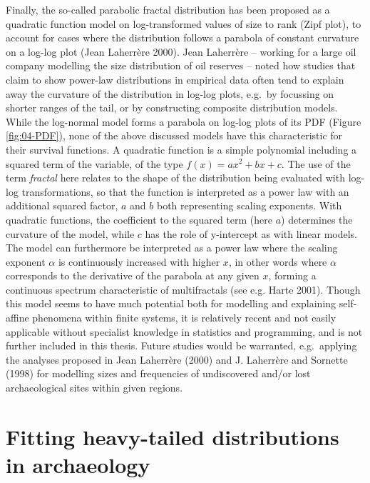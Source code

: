 \documentclass[
  12pt,
  a4paper, twoside]{book}
\begin{document}
Finally, the so-called parabolic fractal distribution has been proposed as a quadratic function model on log-transformed values of size to rank (Zipf plot), to account for cases where the distribution follows a parabola of constant curvature on a log-log plot (Jean Laherrère 2000). Jean Laherrère -- working for a large oil company modelling the size distribution of oil reserves -- noted how studies that claim to show power-law distributions in empirical data often tend to explain away the curvature of the distribution in log-log plots, e.g.~by focussing on shorter ranges of the tail, or by constructing composite distribution models. While the log-normal model forms a parabola on log-log plots of its PDF (Figure \ref{fig:04-PDF}), none of the above discussed models have this characteristic for their survival functions. A quadratic function is a simple polynomial including a squared term of the variable, of the type \(f(x) = ax^2 + bx + c\). The use of the term \emph{fractal} here relates to the shape of the distribution being evaluated with log-log transformations, so that the function is interpreted as a power law with an additional squared factor, \(a\) and \(b\) both representing scaling exponents. With quadratic functions, the coefficient to the squared term (here \(a\)) determines the curvature of the model, while \(c\) has the role of y-intercept as with linear models. The model can furthermore be interpreted as a power law where the scaling exponent \(\alpha\) is continuously increased with higher \(x\), in other words where \(\alpha\) corresponds to the derivative of the parabola at any given \(x\), forming a continuous spectrum characteristic of multifractals (see e.g. Harte 2001). Though this model seems to have much potential both for modelling and explaining self-affine phenomena within finite systems, it is relatively recent and not easily applicable without specialist knowledge in statistics and programming, and is not further included in this thesis. Future studies would be warranted, e.g.~applying the analyses proposed in Jean Laherrère (2000) and J. Laherrère and Sornette (1998) for modelling sizes and frequencies of undiscovered and/or lost archaeological sites within given regions.

\hypertarget{distfit-archaeo}{%
\section{Fitting heavy-tailed distributions in archaeology}\label{distfit-archaeo}}
\end{document}

